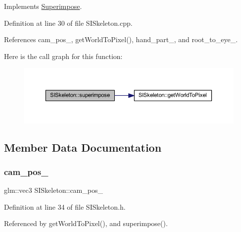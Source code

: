 Implements \mbox{\hyperlink{classSuperimpose_a62c4c269b8fc34cc36d3d54fa4acb35c}{Superimpose}}.



Definition at line 30 of file S\+I\+Skeleton.\+cpp.



References cam\+\_\+pos\+\_\+, get\+World\+To\+Pixel(), hand\+\_\+part\+\_\+, and root\+\_\+to\+\_\+eye\+\_\+.

Here is the call graph for this function\+:
\nopagebreak
\begin{figure}[H]
\begin{center}
\leavevmode
\includegraphics[width=350pt]{classSISkeleton_a3f49fa3419370c2597435768f280c747_cgraph}
\end{center}
\end{figure}


\subsection{Member Data Documentation}
\mbox{\label{classSISkeleton_a63f1395d3e57e2d6a6d7de50928221a2}} 
\subsubsection{\texorpdfstring{cam\+\_\+pos\+\_\+}{cam\_pos\_}}
{\footnotesize\ttfamily glm\+::vec3 S\+I\+Skeleton\+::cam\+\_\+pos\+\_\+\hspace{0.3cm}{\ttfamily [private]}}



Definition at line 34 of file S\+I\+Skeleton.\+h.



Referenced by get\+World\+To\+Pixel(), and superimpose().

\mbox{\label{classSISkeleton_ae88bbaec338923a85f4afbf8704a6933}} 
